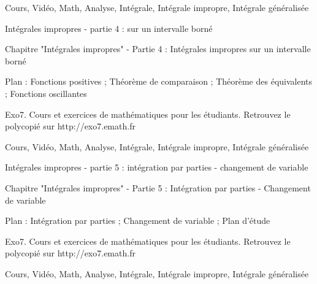 
Cours, Vidéo, Math, Analyse, Intégrale, Intégrale impropre, Intégrale généralisée



Intégrales impropres - partie 4 : sur un intervalle borné


\video{}

Chapitre "Intégrales impropres" - Partie 4 : Intégrales impropres sur un intervalle borné

Plan : Fonctions positives ; Théorème de comparaison ;
Théorème des équivalents ; Fonctions oscillantes

Exo7. Cours et exercices de mathématiques pour les étudiants.
Retrouvez le polycopié sur http://exo7.emath.fr


Cours, Vidéo, Math, Analyse, Intégrale, Intégrale impropre, Intégrale généralisée



Intégrales impropres - partie 5 : intégration par parties - changement de variable


\video{}

Chapitre "Intégrales impropres" - Partie 5 : Intégration par parties - Changement de variable

Plan : Intégration par parties ; Changement de variable ;
Plan d'étude

Exo7. Cours et exercices de mathématiques pour les étudiants.
Retrouvez le polycopié sur http://exo7.emath.fr


Cours, Vidéo, Math, Analyse, Intégrale, Intégrale impropre, Intégrale généralisée
